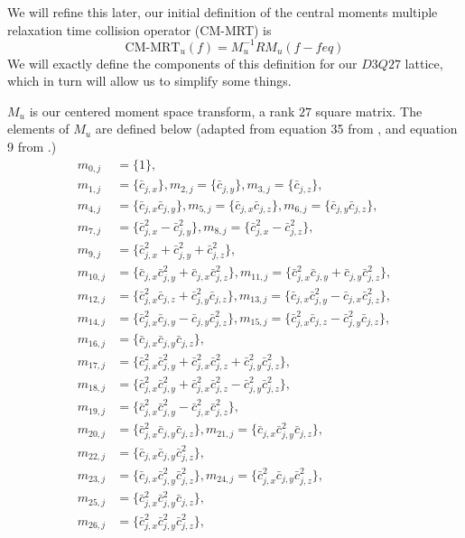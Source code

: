 We will refine this later, our initial definition of 
the central moments multiple relaxation time collision operator (CM-MRT) 
is
$$\label{eqn:cm_mrt_def_init}
\text{CM-MRT}_{u}(f) = M_u^{-1} R  M_u(f - feq)
$$
We will exactly define the components of this definition for our
$D3Q27$ lattice, which in turn will allow us to simplify some things.

$M_u$ is our centered moment space transform, 
a rank $27$ square matrix.
The elements of $M_u$ are defined below 
(adapted from equation 35 from \cite{Li2020Supplement}, 
and equation 9 from \cite{De2017}.)
\begin{align*}
m_{0,j} &= \{  1 \},\\
m_{1,j} &= \{  \bar{c}_{j,x} \},
m_{2,j} = \{  \bar{c}_{j,y} \},
m_{3,j} = \{  \bar{c}_{j,z} \},\\
m_{4,j} &= \{  \bar{c}_{j,x} \bar{c}_{j,y} \},
m_{5,j} = \{  \bar{c}_{j,x} \bar{c}_{j,z} \},
m_{6,j} = \{  \bar{c}_{j,y} \bar{c}_{j,z} \},\\
m_{7,j} &= \{  \bar{c}_{j,x}^2 - \bar{c}_{j,y}^2 \},
m_{8,j} = \{  \bar{c}_{j,x}^2 - \bar{c}_{j,z}^2 \}, \\
m_{9,j} &= \{  \bar{c}_{j,x}^2 + \bar{c}_{j,y}^2 + \bar{c}_{j,z}^2 \},\\
m_{10,j} &= \{ \bar{c}_{j,x} \bar{c}_{j,y}^2 + \bar{c}_{j,x} \bar{c}_{j,z}^2 \},
m_{11,j} = \{ \bar{c}_{j,x}^2 \bar{c}_{j,y} + \bar{c}_{j,y} \bar{c}_{j,z}^2 \},\\
m_{12,j} &= \{ \bar{c}_{j,x}^2 \bar{c}_{j,z} + \bar{c}_{j,y}^2 \bar{c}_{j,z} \},
m_{13,j} = \{ \bar{c}_{j,x} \bar{c}_{j,y}^2 - \bar{c}_{j,x} \bar{c}_{j,z}^2 \},\\
m_{14,j} &= \{ \bar{c}_{j,x}^2 \bar{c}_{j,y} - \bar{c}_{j,y} \bar{c}_{j,z}^2 \},
m_{15,j} = \{ \bar{c}_{j,x}^2 \bar{c}_{j,z} - \bar{c}_{j,y}^2 \bar{c}_{j,z} \},\\
m_{16,j} &= \{ \bar{c}_{j,x} \bar{c}_{j,y} \bar{c}_{j,z} \},\\
m_{17,j} &= \{ \bar{c}_{j,x}^2 \bar{c}_{j,y}^2 + \bar{c}_{j,x}^2 \bar{c}_{j,z}^2 + \bar{c}_{j,y}^2 \bar{c}_{j,z}^2 \},\\
m_{18,j} &= \{ \bar{c}_{j,x}^2 \bar{c}_{j,y}^2 + \bar{c}_{j,x}^2 \bar{c}_{j,z}^2 - \bar{c}_{j,y}^2 \bar{c}_{j,z}^2 \}, \\
m_{19,j} &= \{ \bar{c}_{j,x}^2 \bar{c}_{j,y}^2 - \bar{c}_{j,x}^2 \bar{c}_{j,z}^2 \},\\
m_{20,j} &= \{ \bar{c}_{j,x}^2 \bar{c}_{j,y} \bar{c}_{j,z} \},
m_{21,j} = \{ \bar{c}_{j,x} \bar{c}_{j,y}^2 \bar{c}_{j,z} \},\\
m_{22,j} &= \{ \bar{c}_{j,x} \bar{c}_{j,y} \bar{c}_{j,z}^2 \},\\
m_{23,j} &= \{ \bar{c}_{j,x} \bar{c}_{j,y}^2 \bar{c}_{j,z}^2 \},
m_{24,j} = \{ \bar{c}_{j,x}^2 \bar{c}_{j,y} \bar{c}_{j,z}^2 \},\\
m_{25,j} &= \{ \bar{c}_{j,x}^2 \bar{c}_{j,y}^2 \bar{c}_{j,z} \},\\
m_{26,j} &= \{ \bar{c}_{j,x}^2 \bar{c}_{j,y}^2 \bar{c}_{j,z}^2 \},\\
\end{align*}

